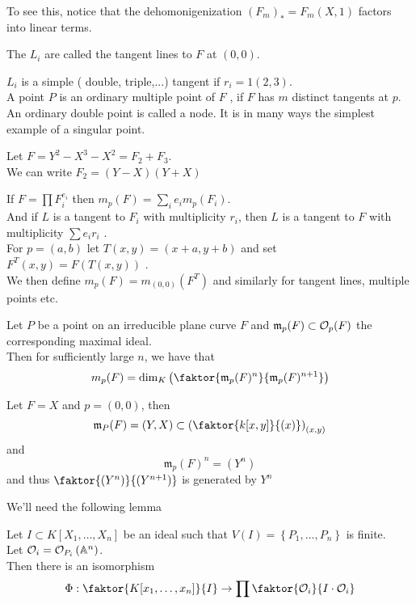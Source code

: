 \documentclass[../main.tex]{subfiles}
\begin{document}
To see this, notice that the dehomonigenization $( F_m)_{\ast} = F_m( X,1) $ factors into linear terms.
\begin{defn}
	The $L_i$ are called the tangent lines to $F$ at $( 0,0) $.
\end{defn}
$L_i$ is a simple ( double, triple,...) tangent if $r_i=1 ( 2,3) $.\\
A point $P$ is an ordinary multiple point of $F$ , if $F$ has $m$ distinct tangents at $p$.\\
An ordinary double point is called a node. It is in many ways the simplest example of a singular point.
\begin{exemple}
Let $F= Y^{2}-X^{3}-X^{2}= F_2 + F_3$.\\
We can write $F_2= ( Y-X) ( Y+X) $ 
\end{exemple}
If $F= \prod F_i^{e_i}$ then $m_p( F) = \sum_{i}^{ }e_i m_p( F_i) $.\\
And if $L$ is a tangent to $F_i$ with multiplicity $r_i$, then $L$ is a tangent to $F$ with multiplicity $\sum e_i r_i$ .\\
For $p=( a,b) $ let $T( x,y) = ( x+a,y+b) $ and set $F^{T}( x,y) = F( T( x,y) ) $ .\\
We then define $m_p ( F) = m_{( 0,0) } ( F^{T}) $ and similarly for tangent lines, multiple points etc.
\begin{thm}
	Let $P$ be a point on an irreducible plane curve $F$ and $ \mathfrak{m}_p( F) \subset \mathcal{O}_p(F ) $ the corresponding maximal ideal.\\
	Then for sufficiently large $n$, we have that
	\[ 
		m_p( F) = \dim_K \left( \faktor { \mathfrak{m}_p( F) ^{n}}{\mathfrak{m}_p( F) ^{n+1}} \right) 
	\]
\end{thm}
\begin{exemple}
Let $F= X$ and $p=( 0,0) $,
then
\[ 
	\mathfrak{m}_P( F) = ( Y,X)  \subset \left( \faktor { k[x,y]} { ( x )} \right) _{( x,y) }  
\]
and
\[ 
	\mathfrak{m}_p( F) ^{n}= ( Y^{n}) 
\]
and thus $ \faktor { ( Y^{n}) } { ( Y^{n+1}) } $ is generated by $Y^{n}$ 

\end{exemple}
We'll need the following lemma
\begin{lemma}
	Let $I \subset K[X_1,\ldots,X_n]$ be an ideal such that $V( I)= \left\{ P_1,\ldots,P_n \right\}  $ is finite.\\
	Let $\mathcal{O}_i= \mathcal{O}_{P_i} \left( \mathbb{A}^{n}\right) $.\\
	Then there is an isomorphism
	\[ 
		\Phi: \faktor { K[x_1,\ldots,x_n]} { I} \to \prod \faktor { \O_i} { I\cdot \O_i} 
	\]
	
\end{lemma}
\end{document}
